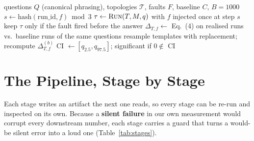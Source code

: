 \documentclass[10pt,twocolumn]{article}
\newcommand{\SF}{\textcolor{sfred}{\textbf{silent failure}}}
\begin{document}
\begin{algorithm}[H]
\caption{Topology robustness, cluster bootstrap (blocks E, F)}\label{alg:robust}
\footnotesize
\begin{algorithmic}[1]
\Require questions $Q$ (canonical phrasing), topologies $\mathcal{T}$, faults $F$, baseline $C$, $B = 1000$
  \State $s \gets \text{hash}(\text{run\_id}, f) \bmod 3$ 
  \State $\tau \gets \textsc{Run}(T, M, q)$ with $f$ injected once at step $s$
  \State keep $\tau$ only if the fault fired before the answer
\EndFor
\State $\Delta_{T,f} \gets$ Eq.~(4) on realised runs vs.\ baseline runs of the same questions
  \State resample templates with replacement; recompute $\Delta_{T,f}^{(b)}$
\EndFor
\State CI $\gets [q_{2.5}, q_{97.5}]$; significant if $0 \notin$ CI
\end{algorithmic}
\end{algorithm}

\section{The Pipeline, Stage by Stage}
Each stage writes an artifact the next one reads, so every stage can be re-run and inspected on its own. Because a
\SF{} in our own measurement would corrupt every downstream number, each stage carries a guard that turns a would-be
silent error into a loud one (Table~\ref{tab:stages}).
\end{document}

